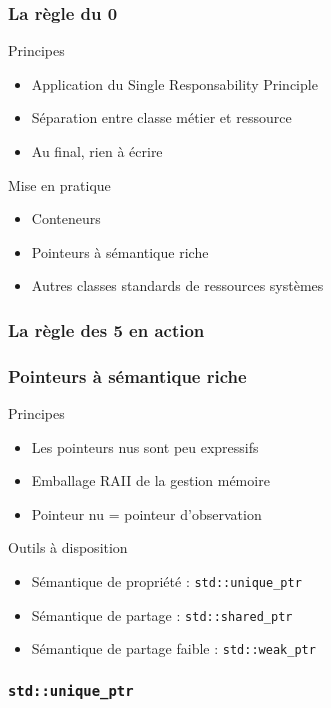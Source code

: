 \documentclass[svgnames]{beamer}
\begin{document}
\frame
{
  \frametitle{La règle du 0}
  \begin{block}{Principes}
  \begin{itemize}
  \item Application du Single Responsability Principle
  \item Séparation entre classe métier et ressource
  \item Au final, rien à écrire
  \end{itemize}
  \end{block}{}

  \begin{block}{Mise en pratique}
  \begin{itemize}
  \item Conteneurs
  \item Pointeurs à sémantique riche
  \item Autres classes standards de ressources systèmes
  \end{itemize}
  \end{block}{}
}

\frame
{
  \frametitle{La règle des 5 en action}
}

\frame
{
  \frametitle{Pointeurs à sémantique riche}
  \begin{block}{Principes}
  \begin{itemize}
  \item Les pointeurs nus sont peu expressifs
  \item Emballage RAII de la gestion mémoire
  \item Pointeur nu = pointeur d'observation
  \end{itemize}
  \end{block}{}

  \begin{block}{Outils à disposition}
  \begin{itemize}
  \item Sémantique de propriété : \texttt{std::unique\_ptr}
  \item Sémantique de partage : \texttt{std::shared\_ptr}
  \item Sémantique de partage faible : \texttt{std::weak\_ptr}
  \end{itemize}
  \end{block}{}
}

\frame
{
  \frametitle{\texttt{std::unique\_ptr}}
}
\end{document}
